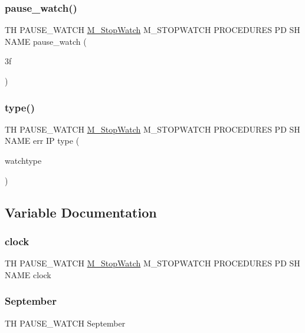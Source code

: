 \subsubsection{\texorpdfstring{pause\+\_\+watch()}{pause\_watch()}}
{\footnotesize\ttfamily TH P\+A\+U\+S\+E\+\_\+\+W\+A\+T\+CH \hyperlink{option__stopwatch_83_8txt_aa2011fc45a5e502e87ee50996a8a9305}{M\+\_\+\+Stop\+Watch} M\+\_\+\+S\+T\+O\+P\+W\+A\+T\+CH P\+R\+O\+C\+E\+D\+U\+R\+ES PD SH N\+A\+ME pause\+\_\+watch (\begin{DoxyParamCaption}\item[{3f}]{ }\end{DoxyParamCaption})}

\mbox{\label{pause__watch_83_8txt_a6d82b64df023fe3efbb7b896bcb179fa}} 
\subsubsection{\texorpdfstring{type()}{type()}}
{\footnotesize\ttfamily TH P\+A\+U\+S\+E\+\_\+\+W\+A\+T\+CH \hyperlink{option__stopwatch_83_8txt_aa2011fc45a5e502e87ee50996a8a9305}{M\+\_\+\+Stop\+Watch} M\+\_\+\+S\+T\+O\+P\+W\+A\+T\+CH P\+R\+O\+C\+E\+D\+U\+R\+ES PD SH N\+A\+ME err IP type (\begin{DoxyParamCaption}\item[{watchtype}]{ }\end{DoxyParamCaption})}



\subsection{Variable Documentation}
\mbox{\label{pause__watch_83_8txt_ae2a6300fc3b4629186796cf6d0c93440}} 
\subsubsection{\texorpdfstring{clock}{clock}}
{\footnotesize\ttfamily TH P\+A\+U\+S\+E\+\_\+\+W\+A\+T\+CH \hyperlink{option__stopwatch_83_8txt_aa2011fc45a5e502e87ee50996a8a9305}{M\+\_\+\+Stop\+Watch} M\+\_\+\+S\+T\+O\+P\+W\+A\+T\+CH P\+R\+O\+C\+E\+D\+U\+R\+ES PD SH N\+A\+ME clock}

\mbox{\label{pause__watch_83_8txt_a9c7b5c1b7a2e7848e0da5b3d021ecba9}} 
\subsubsection{\texorpdfstring{September}{September}}
{\footnotesize\ttfamily TH P\+A\+U\+S\+E\+\_\+\+W\+A\+T\+CH September}


